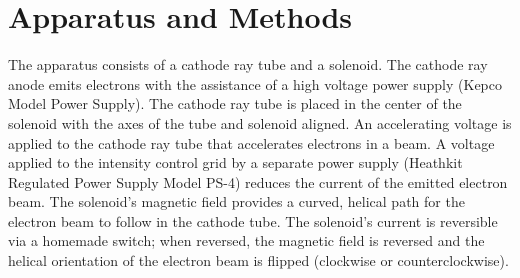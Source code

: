 \documentclass[%
 aip,
 amsmath,amssymb,
 reprint,%
floatfix,
]{revtex4-1}
\begin{document}
\section{\label{sec:level3}Apparatus and Methods}

The apparatus consists of a cathode ray tube and a solenoid. The cathode ray anode emits electrons with the assistance of a high voltage power supply (Kepco Model Power Supply). The cathode ray tube is placed in the center of the solenoid with the axes of the tube and solenoid aligned. An accelerating voltage is applied to the cathode ray tube that accelerates electrons in a beam. A voltage applied to the intensity control grid by a separate power supply (Heathkit Regulated Power Supply Model PS-4) reduces the current of the emitted electron beam. The solenoid's magnetic field provides a curved, helical path for the electron beam to follow in the cathode tube. The solenoid's current is reversible via a homemade switch; when reversed, the magnetic field is reversed and the helical orientation of the electron beam is flipped (clockwise or counterclockwise).
\end{document}
